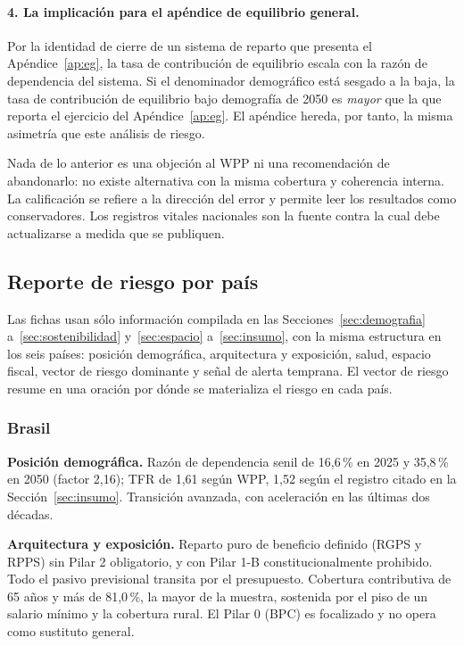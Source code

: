 \documentclass[12pt, letterpaper]{article}
\begin{document}
\paragraph{4. La implicación para el apéndice de equilibrio general.} Por la
identidad de cierre de un sistema de reparto que presenta el
Apéndice~\ref{ap:eg}, la tasa de contribución de equilibrio escala con la razón de
dependencia del sistema. Si el denominador demográfico está sesgado a la baja, la
tasa de contribución de equilibrio bajo demografía de 2050 es \emph{mayor} que la
que reporta el ejercicio del Apéndice~\ref{ap:eg}. El apéndice hereda, por
tanto, la misma asimetría que este análisis de riesgo.

Nada de lo anterior es una objeción al WPP ni una recomendación de abandonarlo: no
existe alternativa con la misma cobertura y coherencia interna. La calificación se
refiere a la dirección del error y permite leer los resultados como conservadores.
Los registros vitales nacionales son la fuente contra la cual debe actualizarse a
medida que se publiquen.

\subsection{Reporte de riesgo por país}
\label{sec:fichas}

Las fichas usan sólo información compilada en las
Secciones~\ref{sec:demografia} a~\ref{sec:sostenibilidad} y~\ref{sec:espacio}
a~\ref{sec:insumo}, con la misma estructura en los seis países: posición
demográfica, arquitectura y exposición, salud, espacio fiscal, vector de riesgo
dominante y señal de alerta temprana. El vector de riesgo resume en una oración por
dónde se materializa el riesgo en cada país.

\subsubsection{Brasil}

\textbf{Posición demográfica.} Razón de dependencia senil de 16,6\,\% en 2025 y
35,8\,\% en 2050 (factor 2,16); TFR de 1,61 según WPP, 1,52 según el registro
citado en la Sección~\ref{sec:insumo}. Transición avanzada, con aceleración en las
últimas dos décadas.

\textbf{Arquitectura y exposición.} Reparto puro de beneficio definido (RGPS y
RPPS) sin Pilar 2 obligatorio, y con Pilar 1-B constitucionalmente prohibido. Todo
el pasivo previsional transita por el presupuesto. Cobertura contributiva de 65
años y más de 81,0\,\%, la mayor de la muestra, sostenida por el piso de un salario
mínimo y la cobertura rural. El Pilar 0 (BPC) es focalizado y no opera como
sustituto general.
\end{document}
